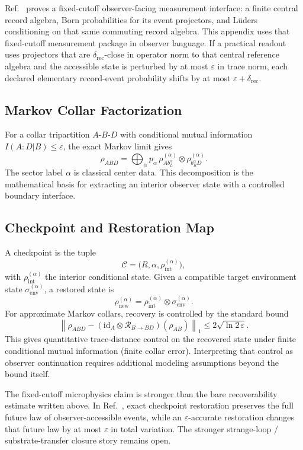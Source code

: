 Ref.~\cite{ophmicrophysics} proves a fixed-cutoff observer-facing measurement interface: a
finite central record algebra, Born probabilities for its event projectors, and L\"uders
conditioning on that same commuting record algebra. This appendix uses that fixed-cutoff
measurement package in observer language. If a practical readout uses projectors that are
\(\delta_{\mathrm{rec}}\)-close in operator norm to that central reference algebra and the
accessible state is perturbed by at most \(\varepsilon\) in trace norm, each declared elementary
record-event probability shifts by at most \(\varepsilon+\delta_{\mathrm{rec}}\).

\subsection{Markov Collar Factorization}

For a collar tripartition \(A\)-\(B\)-\(D\) with conditional mutual information
\(I(A:D|B)\le\varepsilon\), the exact Markov limit gives
\[
\rho_{ABD}
=\bigoplus_{\alpha} p_{\alpha}\,
\rho^{(\alpha)}_{A b_L^{\alpha}}
\otimes
\rho^{(\alpha)}_{b_R^{\alpha} D}.
\]
The sector label \(\alpha\) is classical center data. This decomposition is the mathematical
basis for extracting an interior observer state with a controlled boundary interface.

\subsection{Checkpoint and Restoration Map}

A checkpoint is the tuple
\[
\mathcal{C}=\bigl(R,\alpha,\rho_{\mathrm{int}}^{(\alpha)}\bigr),
\]
with \(\rho_{\mathrm{int}}^{(\alpha)}\) the interior conditional state. Given a compatible target
environment state \(\sigma_{\mathrm{env}}^{(\alpha)}\), a restored state is
\[
\rho_{\mathrm{new}}^{(\alpha)}
=
\rho_{\mathrm{int}}^{(\alpha)}
\otimes
\sigma_{\mathrm{env}}^{(\alpha)}.
\]
For approximate Markov collars, recovery is controlled by the standard bound
\[
\left\|
\rho_{ABD}
-
(\mathrm{id}_A\otimes\mathcal{R}_{B\to BD})(\rho_{AB})
\right\|_1
\le
2\sqrt{\ln 2\,\varepsilon}.
\]
This gives quantitative trace-distance control on the recovered state under finite conditional
mutual information (finite collar error). Interpreting that control as observer continuation
requires additional modeling assumptions beyond the bound itself.

The fixed-cutoff microphysics claim is stronger than the bare recoverability estimate written
above. In Ref.~\cite{ophmicrophysics}, exact checkpoint restoration preserves the full future
law of observer-accessible events, while an \(\varepsilon\)-accurate restoration changes that
future law by at most \(\varepsilon\) in total variation. The stronger strange-loop / substrate-transfer closure story
remains open.

